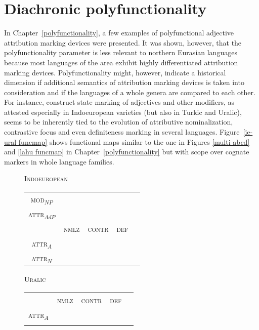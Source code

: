 {\section{Diachronic polyfunctionality}
In Chapter~\ref{polyfunctionality}, a few examples of polyfunctional adjective attribution marking devices were presented. It was shown, however, that the polyfunctionality parameter is less relevant to northern Eurasian languages because most languages of the area exhibit highly differentiated attribution marking devices. Polyfunctionality might, however, indicate a historical dimension if additional semantics of attribution marking devices is taken into consideration and if the languages of a whole genera are compared to each other. For instance, construct state marking of adjectives and other modifiers, as attested especially in Indoeuropean varieties (but also in Turkic and Uralic), seems to be inherently tied to the evolution of attributive nominalization, contrastive focus and even definiteness marking in several languages. Figure~\ref{ie-ural funcmap} shows functional maps similar to the one in Figures \ref{multi abcd} and \ref{lahu funcmap} in Chapter~\ref{polyfunctionality} but with scope over cognate markers in whole language families.
\begin{figure}[htbp]
\parbox[b]{0.5\textwidth}{
\begin{center}\textsc{Indoeuropean}\\
\medskip
\begin{tabular}{| c || c | c | c | c}
\cline{1-1}
\textsc{mod}$_{NP}$\\
\cline{1-1}
\textsc{attr}$_{AdP}$\\
\hline
 & \textsc{nmlz} & \textsc{contr} & \textsc{def}\\
\hline
\textsc{attr}$_{A}$\\
\cline{1-1}
\textsc{attr}$_{N}$\\
\cline{1-1}
\end{tabular}
\end{center}
}
\parbox[b]{0.5\textwidth}{
\begin{center}\textsc{Uralic}\\
\medskip
\begin{tabular}{| c || c | c | c | c}
\cline{1-1}
\\
\cline{1-1}
\\
\hline
 & \textsc{nmlz} & \textsc{contr} & \textsc{def}\\
\hline
\textsc{attr}$_{A}$\\
\cline{1-1}
\\
\cline{1-1}
\end{tabular}
\end{center}
}


\end{figure}}
